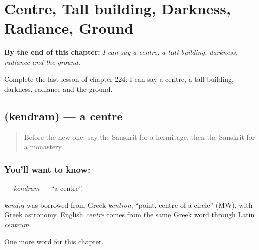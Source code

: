 
\chapter{Centre, Tall building, Darkness, Radiance, Ground}
\label{ch:sa-centre-tall-building-darkness-radiance-ground}

\begin{chapteropening}
\textbf{By the end of this chapter:} \emph{I can say a centre, a tall building, darkness, radiance and the ground.}

Complete the last lesson of chapter 224: I can say a centre, a tall building, darkness, radiance and the ground.
\end{chapteropening}

\section[\texorpdfstring{\sk{केन्द्रम्} (kendram)}{केन्द्रम् (kendram)}]{ (kendram) — a centre}

\label{lesson:SA-C224-kendram}



\begin{quote}
Before the new one: say the Sanskrit for a hermitage, then the Sanskrit for a monastery.
\end{quote}

\subsection*{You'll want to know: }
\textbf{} — \emph{kendram} — \textquotedblleft{}a centre\textquotedblright{}.

\begin{cousinweb}
\emph{kendra} was borrowed from Greek \emph{kentron}, \textquotedblleft{}point, centre of a circle\textquotedblright{} (MW), with Greek astronomy. English \emph{centre} comes from the same Greek word through Latin \emph{centrum}.
\end{cousinweb}

\begin{grammarlens}[title={What you've built}]
One more word for this chapter.
\end{grammarlens}

